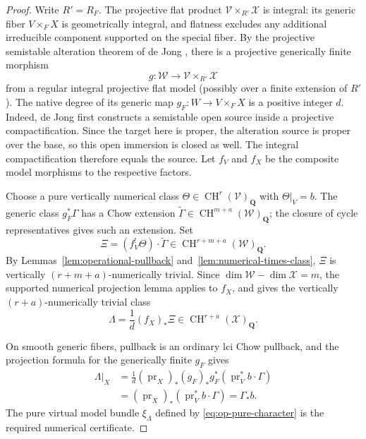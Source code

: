 \documentclass[11pt]{article}
\theoremstyle{definition}
\theoremstyle{remark}
\numberwithin{equation}{section}
\newcommand{\CH}{\operatorname{CH}}
\begin{document}
\begin{proof}
Write $R'=R_F$.  The projective flat product
$\mathcal V\times_{R'}\mathcal X$ is integral: its generic
fiber $V\times_F X$ is geometrically integral, and flatness
excludes any additional irreducible component supported on the
special fiber.  By the projective semistable alteration theorem
of de Jong \cite[Theorem~6.5]{deJong}, there is a projective
generically finite morphism
\[
 g:\mathcal W\longrightarrow
                  \mathcal V\times_{R'}\mathcal X
\]
from a regular integral projective flat model (possibly over a
finite extension of $R'$).  The native degree of its generic
map $g_F:W\to V\times_F X$ is a positive integer $d$.
Indeed, de Jong first constructs a semistable open source inside
a projective compactification.  Since the target here is proper,
the alteration source is proper over the base, so this open
immersion is closed as well.  The integral compactification
therefore equals the source.
Let $f_V$ and $f_X$ be the composite model morphisms to the
respective factors.

Choose a pure vertically numerical class
$\Theta\in\CH^r(\mathcal V)_{\mathbf Q}$ with
$\Theta|_V=b$.  The generic class $g_F^*\Gamma$ has a Chow
extension $\widetilde\Gamma\in\CH^{m+a}(\mathcal W)_{\mathbf Q}$;
the closure of cycle representatives gives such an extension.
Set
\[
 \Xi=(f_V^!\Theta)\cdot\widetilde\Gamma
      \in\CH^{r+m+a}(\mathcal W)_{\mathbf Q}.
\]
By Lemmas~\ref{lem:operational-pullback}
and~\ref{lem:numerical-times-class},
$\Xi$ is vertically $(r+m+a)$-numerically trivial.  Since
$\dim\mathcal W-\dim\mathcal X=m$, the supported numerical
projection lemma applies to $f_X$, and gives the vertically
$(r+a)$-numerically trivial class
\[
          \Lambda=\frac1d(f_X)_*\Xi
                     \in\CH^{r+a}(\mathcal X)_{\mathbf Q}.
\]

On smooth generic fibers, pullback is an ordinary lci Chow
pullback, and the projection formula for the generically finite
$g_F$ gives
\[
 \begin{aligned}
 \Lambda|_X
  &=\frac1d(\operatorname{pr}_X)_*
       (g_F)_*g_F^*(\operatorname{pr}_V^*b\cdot\Gamma)\\
  &=(\operatorname{pr}_X)_*
                      (\operatorname{pr}_V^*b\cdot\Gamma)
   =\Gamma_*b.
 \end{aligned}
\]
The pure virtual model bundle $\xi_\Lambda$ defined by
\eqref{eq:op-pure-character} is the required numerical
certificate.
\end{proof}
\end{document}
